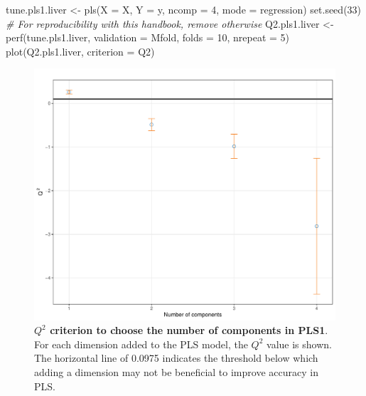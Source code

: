 \documentclass[
]{book}
\newenvironment{Shaded}{\begin{snugshade}}{\end{snugshade}}
\newcommand{\AttributeTok}[1]{\textcolor[rgb]{0.77,0.63,0.00}{#1}}
\newcommand{\CommentTok}[1]{\textcolor[rgb]{0.56,0.35,0.01}{\textit{#1}}}
\newcommand{\DecValTok}[1]{\textcolor[rgb]{0.00,0.00,0.81}{#1}}
\newcommand{\FunctionTok}[1]{\textcolor[rgb]{0.00,0.00,0.00}{#1}}
\newcommand{\NormalTok}[1]{#1}
\newcommand{\OtherTok}[1]{\textcolor[rgb]{0.56,0.35,0.01}{#1}}
\newcommand{\StringTok}[1]{\textcolor[rgb]{0.31,0.60,0.02}{#1}}
\begin{document}
\begin{Shaded}
\begin{Highlighting}[]
\NormalTok{tune.pls1.liver }\OtherTok{\textless{}{-}} \FunctionTok{pls}\NormalTok{(}\AttributeTok{X =}\NormalTok{ X, }\AttributeTok{Y =}\NormalTok{ y, }\AttributeTok{ncomp =} \DecValTok{4}\NormalTok{, }\AttributeTok{mode =} \StringTok{\textquotesingle{}regression\textquotesingle{}}\NormalTok{)}
\FunctionTok{set.seed}\NormalTok{(}\DecValTok{33}\NormalTok{)  }\CommentTok{\# For reproducibility with this handbook, remove otherwise}
\NormalTok{Q2.pls1.liver }\OtherTok{\textless{}{-}} \FunctionTok{perf}\NormalTok{(tune.pls1.liver, }\AttributeTok{validation =} \StringTok{\textquotesingle{}Mfold\textquotesingle{}}\NormalTok{, }
                      \AttributeTok{folds =} \DecValTok{10}\NormalTok{, }\AttributeTok{nrepeat =} \DecValTok{5}\NormalTok{)}
\FunctionTok{plot}\NormalTok{(Q2.pls1.liver, }\AttributeTok{criterion =} \StringTok{\textquotesingle{}Q2\textquotesingle{}}\NormalTok{)}
\end{Highlighting}
\end{Shaded}

\begin{figure}

{\centering \includegraphics[width=0.7\linewidth]{Figures/PLS/04-spls1-ncomp-1} 

}

\caption{\textbf{\(Q^2\) criterion to choose the number of components in PLS1}. For each dimension added to the PLS model, the \(Q^2\) value is shown. The horizontal line of 0.0975 indicates the threshold below which adding a dimension may not be beneficial to improve accuracy in PLS.}\label{fig:04-spls1-ncomp}
\end{figure}
\end{document}

